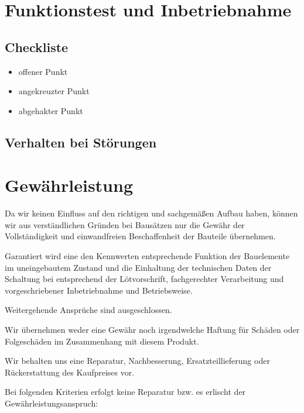 \documentclass[fleqn,10pt]{SelfArx} %
\begin{document}

\section{Funktionstest und Inbetriebnahme}

 \subsection*{Checkliste}

\begin{itemize}[noitemsep] %
\item[\Square] offener Punkt
\item[\XBox] angekreuzter Punkt
\item[\CheckedBox] abgehakter Punkt
\end{itemize}

 \subsection*{Verhalten bei Störungen}


\section{Gewährleistung}

Da wir keinen Einfluss auf den richtigen und sachgemäßen Aufbau haben, können wir aus verständlichen Gründen bei Bausätzen nur die Gewähr der Vollständigkeit und einwandfreien Beschaffenheit der Bauteile übernehmen.

Garantiert wird eine den Kennwerten entsprechende Funktion der Bauelemente im uneingebautem Zustand und die Einhaltung der technischen Daten der Schaltung bei entsprechend der Lötvorschrift,
fachgerechter Verarbeitung und vorgeschriebener Inbetriebnahme und Betriebsweise.

Weitergehende Ansprüche sind ausgeschlossen.

Wir übernehmen weder eine Gewähr noch irgendwelche Haftung für Schäden oder Folgeschäden im Zusammenhang mit diesem Produkt.

Wir behalten uns eine Reparatur, Nachbesserung, Ersatzteillieferung oder Rückerstattung des Kaufpreises vor.

Bei folgenden Kriterien erfolgt keine Reparatur bzw. es erlischt der Gewährleistungsanspruch:
\end{document}
